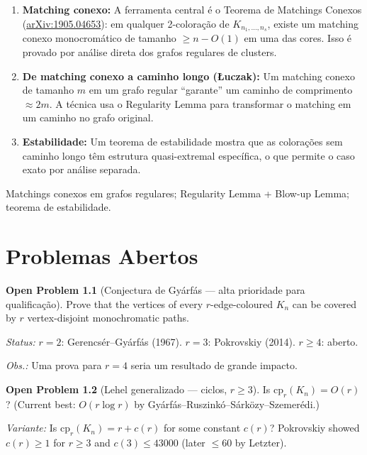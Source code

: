 \documentclass[12pt,a4paper,twoside,openright]{book}
\theoremstyle{definition}
\newtheorem{problem}{Open Problem}[chapter]
\newcommand{\arxiv}[1]{\href{https://arxiv.org/abs/#1}{\textcolor{linkcolor}{arXiv:#1}}}
\begin{document}
\begin{proofsketch}
\begin{enumerate}[leftmargin=*]
  \item \textbf{Matching conexo:} A ferramenta central é o Teorema de Matchings Conexos (\arxiv{1905.04653}):
        em qualquer 2-coloração de $K_{n_1,\ldots,n_s}$, existe um matching conexo monocromático
        de tamanho $\geq n - O(1)$ em uma das cores.
        Isso é provado por análise direta dos grafos regulares de clusters.

  \item \textbf{De matching conexo a caminho longo (Łuczak):} Um matching conexo de tamanho $m$
        em um grafo regular ``garante'' um caminho de comprimento $\approx 2m$.
        A técnica usa o Regularity Lemma para transformar o matching em um caminho no grafo original.

  \item \textbf{Estabilidade:} Um teorema de estabilidade mostra que as colorações sem caminho longo
        têm estrutura quasi-extremal específica, o que permite o caso exato por análise separada.
\end{enumerate}
\end{proofsketch}

\begin{techniques}
Matchings conexos em grafos regulares; Regularity Lemma + Blow-up Lemma; teorema de estabilidade.
\end{techniques}

\chapter{Problemas Abertos}

\begin{problem}[Conjectura de Gyárfás — alta prioridade para qualificação]
Prove that the vertices of every $r$-edge-coloured $K_n$ can be covered by $r$ vertex-disjoint
monochromatic paths.

\medskip\noindent
\textit{Status:} $r=2$: Gerencsér--Gyárfás (1967). $r=3$: Pokrovskiy (2014). $r \geq 4$: aberto.

\medskip\noindent
\textit{Obs.:} Uma prova para $r=4$ seria um resultado de grande impacto.
\end{problem}

\begin{problem}[Lehel generalizado — ciclos, $r \geq 3$]
Is $\mathrm{cp}_r(K_n) = O(r)$? (Current best: $O(r\log r)$ by Gyárfás--Ruszinkó--Sárközy--Szemerédi.)

\medskip\noindent
\textit{Variante:} Is $\mathrm{cp}_r(K_n) = r+c(r)$ for some constant $c(r)$?
Pokrovskiy showed $c(r) \geq 1$ for $r \geq 3$ and $c(3) \leq 43000$ (later $\leq 60$ by Letzter).
\end{problem}
\end{document}

